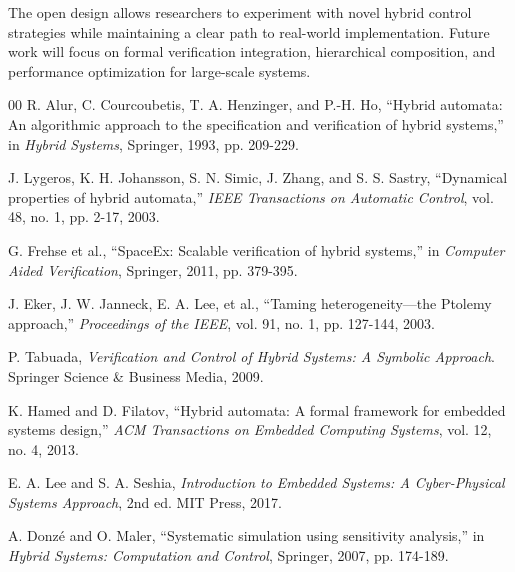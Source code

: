 \documentclass[conference]{IEEEtran}
\begin{document}
The open design allows researchers to experiment with novel hybrid control strategies while maintaining a clear path to real-world implementation. Future work will focus on formal verification integration, hierarchical composition, and performance optimization for large-scale systems.

\begin{thebibliography}{00}
 R. Alur, C. Courcoubetis, T. A. Henzinger, and P.-H. Ho, ``Hybrid automata: An algorithmic approach to the specification and verification of hybrid systems,'' in \textit{Hybrid Systems}, Springer, 1993, pp. 209-229.

 J. Lygeros, K. H. Johansson, S. N. Simic, J. Zhang, and S. S. Sastry, ``Dynamical properties of hybrid automata,'' \textit{IEEE Transactions on Automatic Control}, vol. 48, no. 1, pp. 2-17, 2003.

 G. Frehse et al., ``SpaceEx: Scalable verification of hybrid systems,'' in \textit{Computer Aided Verification}, Springer, 2011, pp. 379-395.

 J. Eker, J. W. Janneck, E. A. Lee, et al., ``Taming heterogeneity---the Ptolemy approach,'' \textit{Proceedings of the IEEE}, vol. 91, no. 1, pp. 127-144, 2003.

 P. Tabuada, \textit{Verification and Control of Hybrid Systems: A Symbolic Approach}. Springer Science \& Business Media, 2009.

 K. Hamed and D. Filatov, ``Hybrid automata: A formal framework for embedded systems design,'' \textit{ACM Transactions on Embedded Computing Systems}, vol. 12, no. 4, 2013.

 E. A. Lee and S. A. Seshia, \textit{Introduction to Embedded Systems: A Cyber-Physical Systems Approach}, 2nd ed. MIT Press, 2017.

 A. Donzé and O. Maler, ``Systematic simulation using sensitivity analysis,'' in \textit{Hybrid Systems: Computation and Control}, Springer, 2007, pp. 174-189.
\end{thebibliography}
\end{document}
